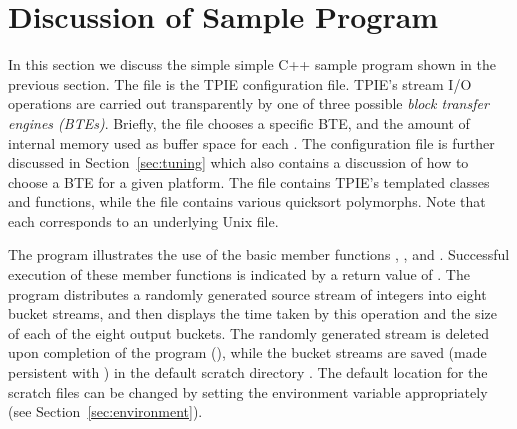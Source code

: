 

\section{Discussion of Sample Program}

In this section we discuss the simple simple C++ sample
program shown in the previous section. The file
 is the TPIE configuration file. TPIE's
 stream I/O operations are carried out
transparently by one of three possible \emph{block transfer
   engines (BTEs)}. Briefly, the file  chooses
a specific BTE, and the amount of internal memory used as
buffer space for each . The
 configuration file is further discussed
in Section~\ref{sec:tuning} which also contains a discussion
of how to choose a BTE for a given platform. The file
 contains TPIE's templated classes and
functions, while the file  contains
various quicksort polymorphs. Note that each
 corresponds to an underlying Unix file.

The program illustrates the use of the basic
 member functions ,
,  and .
Successful execution of these member functions is indicated
by a return value of .  The program
distributes a randomly generated source stream of integers
into eight bucket streams, and then displays the time taken
by this operation and the size of each of the eight output
buckets. The randomly generated stream is deleted upon
completion of the program
(), while the bucket
streams are saved (made persistent with
) in the
default scratch directory . The default
location for the scratch files can be changed by setting the environment variable
 appropriately (see
Section~\ref{sec:environment}).

